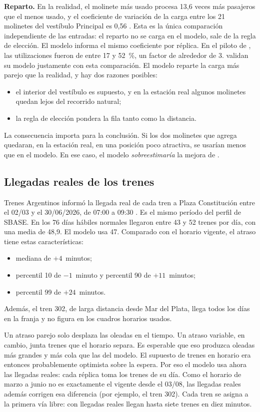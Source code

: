 \textbf{Reparto.} En la realidad, el molinete más usado procesa 13,6 veces más pasajeros que el menos usado,
y el coeficiente de variación de la carga entre los 21 molinetes del vestíbulo Principal es 0,56
\parencite{sbase2026molinetes}. Esta es la única comparación independiente de las entradas: el reparto no
se carga en el modelo, sale de la regla de elección. El modelo informa el mismo coeficiente por réplica. En el piloto de \EO{}, las utilizaciones fueron de entre 17 y 52~\%, un
factor de alrededor de 3. \textcite{seriani2025} validan su modelo justamente con esta comparación. El
modelo reparte la carga más parejo que la realidad, y hay dos razones posibles:
\begin{itemize}
  \item el interior del vestíbulo es supuesto, y en la estación real algunos molinetes quedan lejos del recorrido
        natural;
  \item la regla de elección pondera la fila tanto como la distancia.
\end{itemize}
La consecuencia importa para la conclusión. Si los dos molinetes que agrega \EI{} quedaran, en la
estación real, en una posición poco atractiva, se usarían menos que en el modelo. En ese caso, el modelo
\emph{sobreestimaría} la mejora de \EI{}.

\subsection{Llegadas reales de los trenes}
\label{anx:trenes}

Trenes Argentinos informó la llegada real de cada tren a Plaza Constitución entre el 02/03 y el 30/06/2026,
de 07:00 a 09:30 \parencite{sofse2026nota}. Es el mismo período del perfil de SBASE. En los 76 días
hábiles normales llegaron entre 43 y 52 trenes por día, con una media de 48,9. El modelo usa 47.
Comparado con el horario vigente, el atraso tiene estas características:
\begin{itemize}
  \item mediana de $+4$~minutos;
  \item percentil 10 de $-1$~minuto y percentil 90 de $+11$~minutos;
  \item percentil 99 de $+24$~minutos.
\end{itemize}
Además, el tren 302, de larga distancia desde Mar del Plata, llega todos los días en la franja y no figura
en los cuadros horarios usados.

Un atraso parejo solo desplaza las oleadas en el tiempo. Un atraso variable, en cambio, junta trenes que
el horario separa. Es esperable que eso produzca oleadas más grandes y más cola que las del modelo. El
supuesto de trenes en horario era entonces probablemente optimista sobre la espera. Por eso el modelo
usa ahora las llegadas reales: cada réplica toma los trenes de su día. Como el horario de marzo a junio no
es exactamente el vigente desde el 03/08, las llegadas reales además corrigen esa diferencia (por
ejemplo, el tren 302). Cada tren se asigna a la primera vía libre: con llegadas reales llegan hasta siete
trenes en diez minutos.

